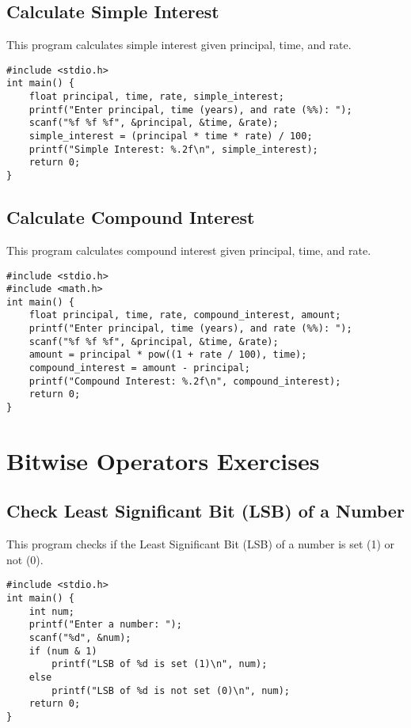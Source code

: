 \documentclass[a4paper,12pt]{article}
\begin{document}
\newpage

\subsection{Calculate Simple Interest}
This program calculates simple interest given principal, time, and rate.

\begin{lstlisting}[caption={Calculate Simple Interest}]
#include <stdio.h>
int main() {
    float principal, time, rate, simple_interest;
    printf("Enter principal, time (years), and rate (%%): ");
    scanf("%f %f %f", &principal, &time, &rate);
    simple_interest = (principal * time * rate) / 100;
    printf("Simple Interest: %.2f\n", simple_interest);
    return 0;
}
\end{lstlisting}

\newpage

\subsection{Calculate Compound Interest}
This program calculates compound interest given principal, time, and rate.

\begin{lstlisting}[caption={Calculate Compound Interest}]
#include <stdio.h>
#include <math.h>
int main() {
    float principal, time, rate, compound_interest, amount;
    printf("Enter principal, time (years), and rate (%%): ");
    scanf("%f %f %f", &principal, &time, &rate);
    amount = principal * pow((1 + rate / 100), time);
    compound_interest = amount - principal;
    printf("Compound Interest: %.2f\n", compound_interest);
    return 0;
}
\end{lstlisting}

\newpage

\section{Bitwise Operators Exercises}

\subsection{Check Least Significant Bit (LSB) of a Number}
This program checks if the Least Significant Bit (LSB) of a number is set (1) or not (0).

\begin{lstlisting}[caption={Check Least Significant Bit (LSB) of a Number}]
#include <stdio.h>
int main() {
    int num;
    printf("Enter a number: ");
    scanf("%d", &num);
    if (num & 1)
        printf("LSB of %d is set (1)\n", num);
    else
        printf("LSB of %d is not set (0)\n", num);
    return 0;
}
\end{lstlisting}
\end{document}
